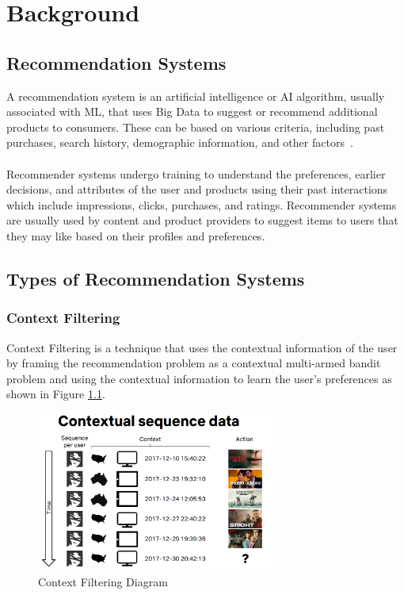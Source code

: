 \chapter{Background}
\minitoc

\section{Recommendation Systems}\label{sec:recommendation-systems}
A recommendation system is an artificial intelligence or AI algorithm, usually associated with ML, that uses Big Data to suggest or recommend additional products to consumers. These can be based on various criteria, including past purchases, search history, demographic information, and other factors~\cite{NvidiaRecSys}. \\ \\
Recommender systems undergo training to understand the preferences, earlier decisions, and attributes of the user and products using their past interactions which include impressions, clicks, purchases, and ratings. Recommender systems are usually used by content and product providers to suggest items to users that they may like based on their profiles and preferences. 

\section{Types of Recommendation Systems}\label{sec:types-of-recommendation-systems}

\subsection{Context Filtering}
Context Filtering is a technique that uses the contextual information of the user by framing the recommendation problem as a contextual multi-armed bandit problem and using the contextual information to learn the user's preferences as shown in Figure \ref{fig:Context-Filtering-Diagram}.
\begin{figure}[H]
    \centering
    \includegraphics[width=0.7\textwidth]{assets/contextual-sequence-prediction.png}
    \caption[Context Filtering Diagram]{Context Filtering Diagram~\cite{NvidiaRecSys}} 
    \label{fig:Context-Filtering-Diagram}
\end{figure}

